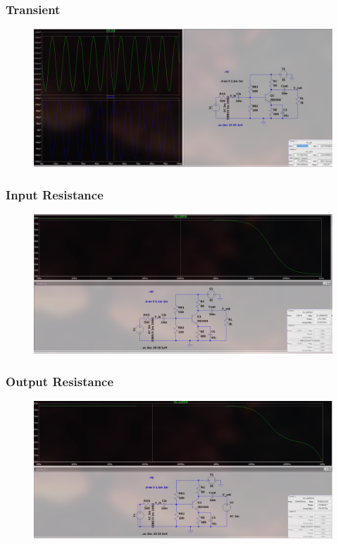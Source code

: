 \documentclass{article}
\begin{document}
\subsubsection{Transient}
\begin{figure}[h!]
        \centering
        \includegraphics[width=0.7\linewidth]{figs/bjt_ce_tr.png}
    \end{figure}
        \pagebreak
\subsubsection{Input Resistance}
\begin{figure}[h!]
        \centering
        \includegraphics[width=0.7\linewidth]{figs/bjt_ce_rin.png}
    \end{figure}
\subsubsection{Output Resistance}
\begin{figure}[h!]
        \centering
        \includegraphics[width=0.7\linewidth]{figs/bjt_ce_rout.png}
    \end{figure}
\end{document}
